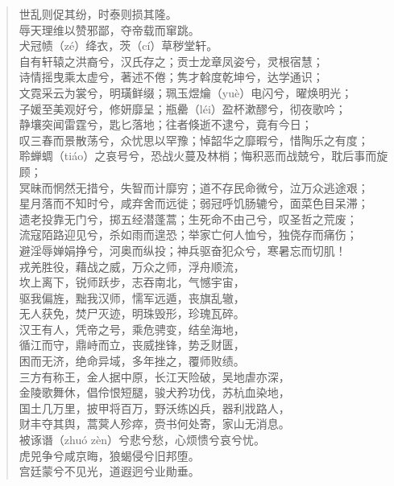 \documentclass[12pt,oneside]{book}
\newenvironment{shici}{%
\begin{verse}%
\centering\large\hspace{12pt}}%
{\end{verse}}
\begin{document}
\begin{shici}
世乱则促其纷，时泰则损其隆。\\
辱天理维以赞邪鄙，夺帝载而窜跳。\\
犬冠帻（zé）绛衣，茨（cí）草秽堂轩。\\
自有轩辕之洪裔兮，汉氏存之；贡士龙章凤姿兮，灵根宿慧；\\
诗情摇曳乘太虚兮，著述不倦；隽才斡度乾坤兮，达学通识；\\
文霓采云为裳兮，明璜鲜缀；珮玉煜爚（yuè）电闪兮，曜焕明光；\\
子媛至美观好兮，修妍靡呈；瓶罍（léi）盈杯漱醪兮，彻夜歌吟；\\
静壤突闻雷霆兮，匙匕落地；往者倏逝不逮兮，竟有今日；\\
叹三春而景散荡兮，众忧思以罕豫；悼韶华之靡暇兮，惜陶乐之有度；\\
聆蝉蜩（tiáo）之哀号兮，恐战火蔓及林梢；悔积恶而战兢兮，耽后事而旋顾；\\
冥昧而惘然无措兮，失智而计靡穷；道不存民命微兮，泣万众逃途艰；\\
星月落而不知时兮，咸弃舍而远徙；弱冠呼饥肠辘兮，面菜色目呆滞；\\
遗老投靠无门兮，掷五经潜蓬蒿；生死命不由己兮，叹圣哲之荒废；\\
流寇陌路迎见兮，杀如雨而遑恐；举家亡何人恤兮，独侥存而痛伤；\\
避淫辱婵娟挣兮，河奥而纵投；神兵驱奋犯众兮，寒暑忘而切肌！\\
戎羌胜役，藉战之威，万众之师，浮舟顺流，\\
坎上离下，锐师跃步，志吞南北，气憾宇宙，\\
驱我偏旌，黜我汉师，懦军远遁，丧旗乱辙，\\
无人获免，焚尸灭迹，明珠毁形，珍瑰瓦碎。\\
汉王有人，凭帝之号，乘危骋变，结垒海地，\\
循江而守，鼎峙而立，丧威挫锋，势乏财匮，\\
困而无济，绝命异域，多年挫之，覆师败绩。\\
三方有称王，金人据中原，长江天险破，吴地虐亦深，\\
金陵歌舞休，倡伶恨短腿，骏犬矜功伐，苏杭血染地，\\
国土几万里，披甲将百万，野沃练凶兵，器利戕路人，\\
财丰夺其舆，蒿蓂人殄瘁，赍书何处寄，家山无消息。\\
被诼谮（zhuó zèn）兮悲兮愁，心烦愦兮哀兮忧。\\
虎兕争兮咸京晦，狼蝎侵兮旧邦堕。\\
宫廷蒙兮不见光，道遐迥兮业勛垂。\\

\end{shici}
\end{document}

